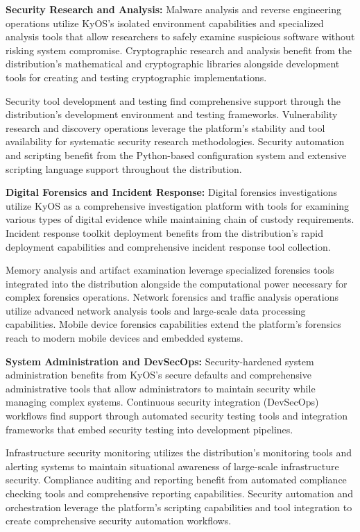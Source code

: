 \documentclass[12pt,a4paper]{article}
\begin{document}
\textbf{Security Research and Analysis:}
Malware analysis and reverse engineering operations utilize KyOS's isolated environment capabilities and specialized analysis tools that allow researchers to safely examine suspicious software without risking system compromise. Cryptographic research and analysis benefit from the distribution's mathematical and cryptographic libraries alongside development tools for creating and testing cryptographic implementations.

Security tool development and testing find comprehensive support through the distribution's development environment and testing frameworks. Vulnerability research and discovery operations leverage the platform's stability and tool availability for systematic security research methodologies. Security automation and scripting benefit from the Python-based configuration system and extensive scripting language support throughout the distribution.

\textbf{Digital Forensics and Incident Response:}
Digital forensics investigations utilize KyOS as a comprehensive investigation platform with tools for examining various types of digital evidence while maintaining chain of custody requirements. Incident response toolkit deployment benefits from the distribution's rapid deployment capabilities and comprehensive incident response tool collection.

Memory analysis and artifact examination leverage specialized forensics tools integrated into the distribution alongside the computational power necessary for complex forensics operations. Network forensics and traffic analysis operations utilize advanced network analysis tools and large-scale data processing capabilities. Mobile device forensics capabilities extend the platform's forensics reach to modern mobile devices and embedded systems.

\textbf{System Administration and DevSecOps:}
Security-hardened system administration benefits from KyOS's secure defaults and comprehensive administrative tools that allow administrators to maintain security while managing complex systems. Continuous security integration (DevSecOps) workflows find support through automated security testing tools and integration frameworks that embed security testing into development pipelines.

Infrastructure security monitoring utilizes the distribution's monitoring tools and alerting systems to maintain situational awareness of large-scale infrastructure security. Compliance auditing and reporting benefit from automated compliance checking tools and comprehensive reporting capabilities. Security automation and orchestration leverage the platform's scripting capabilities and tool integration to create comprehensive security automation workflows.
\end{document}
